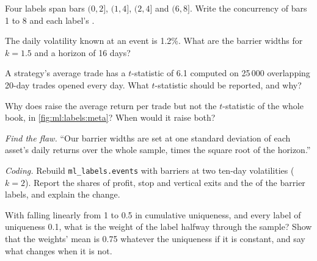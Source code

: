 \begin{exercise}[$\star$]\label{exo:ml:targets-labels-and-sample-weights:2}
Four labels span bars $(0,2]$, $(1,4]$, $(2,4]$ and $(6,8]$. Write the concurrency of bars 1 to 8 and each label's
.
\end{exercise}

\begin{exercise}[$\star$]\label{exo:ml:targets-labels-and-sample-weights:3}
The daily volatility known at an event is 1.2\%. What are the barrier widths for $k = 1.5$ and a horizon of 16 days?
\end{exercise}

\begin{exercise}[$\star\star$]\label{exo:ml:targets-labels-and-sample-weights:4}
A strategy's average trade has a $t$-statistic of 6.1 computed on 25\,000 overlapping 20-day trades opened every day.
What $t$-statistic should be reported, and why?
\end{exercise}

\begin{exercise}[$\star\star$]\label{exo:ml:targets-labels-and-sample-weights:5}
Why does  raise the average return per trade but not the $t$-statistic of the whole book, in
\cref{fig:ml:labels:meta}? When would it raise both?
\end{exercise}

\begin{exercise}[$\star\star$]\label{exo:ml:targets-labels-and-sample-weights:6}
\emph{Find the flaw.} ``Our barrier widths are set at one standard deviation of each asset's daily returns over the whole
sample, times the square root of the horizon.''
\end{exercise}

\begin{exercise}[$\star\star\star$]\label{exo:ml:targets-labels-and-sample-weights:7}
\emph{Coding.} Rebuild \texttt{ml\_labels.events} with barriers at two ten-day volatilities ($k = 2$). Report the shares
of profit, stop and vertical exits and the  of the barrier labels, and explain the change.
\end{exercise}

\begin{exercise}[$\star\star\star$]\label{exo:ml:targets-labels-and-sample-weights:8}
With  falling linearly from 1 to 0.5 in cumulative uniqueness, and every label of uniqueness 0.1, what
is the weight of the label halfway through the sample? Show that the weights' mean is 0.75 whatever the uniqueness if it
is constant, and say what changes when it is not.
\end{exercise}

